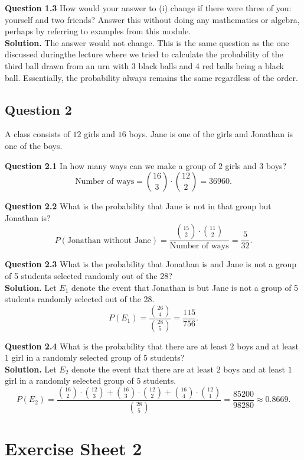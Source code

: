 \documentclass[
]{book}
\begin{document}
\textbf{Question 1.3} How would your answer to (i) change if there were three of you: yourself and two friends? Answer this without doing any mathematics or algebra, perhaps by referring to examples from this module.\\
\textbf{Solution.} The answer would not change. This is the same question as the one discussed duringthe lecture where we tried to calculate the probability of the third ball drawn from an urn with 3 black balls and 4 red balls being a black ball. Essentially, the probability always remains the same regardless of the order.

\section{Question 2}\label{question-2}

A class consists of \(12\) girls and \(16\) boys. Jane is one of the girls and Jonathan is one of the boys.

\textbf{Question 2.1} In how many ways can we make a group of \(2\) girls and \(3\) boys?\\
\[\text{Number of ways} = {16 \choose 3}\cdot{12 \choose 2} = 36960.\]

\textbf{Question 2.2} What is the probability that Jane is not in that group but Jonathan is?\\
\[P(\text{Jonathan without Jane}) = \frac{{15 \choose 2} \cdot {11 \choose 2}}{\text{Number of ways}} = \frac{5}{32}.\]

\textbf{Question 2.3} What is the probability that Jonathan is and Jane is not a group of 5 students selected randomly out of the 28?\\
\textbf{Solution.} Let \(E_1\) denote the event that Jonathan is but Jane is not a group of 5 students randomly selected out of the 28. \[P(E_1) = \frac{{26 \choose 4}}{{28 \choose 5}} = \frac{115}{756}.\]

\textbf{Question 2.4} What is the probability that there are at least \(2\) boys and at least \(1\) girl in a randomly selected group of \(5\) students?\\
\textbf{Solution.} Let \(E_2\) denote the event that there are at least \(2\) boys and at least \(1\) girl in a randomly selected group of \(5\) students. \[P(E_2) = \frac{{16 \choose 2} \cdot {12 \choose 3} + {16 \choose 3} \cdot {12 \choose 2} + {16 \choose 4} \cdot {12 \choose 1}}{{28 \choose 5}} = \frac{85200}{98280} \approx 0.8669.\]

\chapter{Exercise Sheet 2}\label{exercise-sheet-2}
\end{document}
